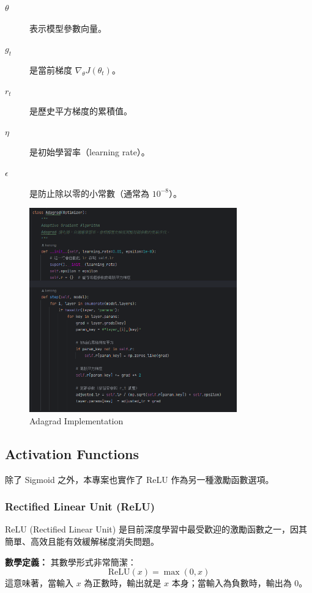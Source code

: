\documentclass{article}
\begin{document}
\begin{description}
  \item[\(\theta\)] 表示模型參數向量。
  \item[\(g_t\)] 是當前梯度 \(\nabla_\theta J(\theta_t)\)。
  \item[\(r_t\)] 是歷史平方梯度的累積值。
  \item[\(\eta\)] 是初始學習率（learning rate）。
  \item[\(\epsilon\)] 是防止除以零的小常數（通常為 \(10^{-8}\)）。
\end{description}
\begin{figure}[H]
    \centering
    \includegraphics[width=0.8\textwidth]{Lab01_report/img/6.1adagrad.png}
    \caption{Adagrad Implementation}
    \label{fig:adagrad_code}
\end{figure}

\subsection{Activation Functions}
除了 Sigmoid 之外，本專案也實作了 ReLU 作為另一種激勵函數選項。

\subsubsection{Rectified Linear Unit (ReLU)}
ReLU (Rectified Linear Unit) 是目前深度學習中最受歡迎的激勵函數之一，因其簡單、高效且能有效緩解梯度消失問題。

\textbf{數學定義：}
其數學形式非常簡潔：
\[
\text{ReLU}(x) = \max(0, x)
\]
這意味著，當輸入 \(x\) 為正數時，輸出就是 \(x\) 本身；當輸入為負數時，輸出為 0。
\end{document}
